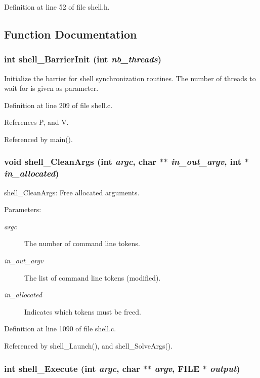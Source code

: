 Definition at line 52 of file shell.h.

\subsection{Function Documentation}
\subsubsection{\setlength{\rightskip}{0pt plus 5cm}int shell\_\-Barrier\-Init (int {\em nb\_\-threads})}\label{shell_8h_a10}


Initialize the barrier for shell synchronization routines. The number of threads to wait for is given as parameter. 

Definition at line 209 of file shell.c.

References P, and V.

Referenced by main().
\subsubsection{\setlength{\rightskip}{0pt plus 5cm}void shell\_\-Clean\-Args (int {\em argc}, char $\ast$$\ast$ {\em in\_\-out\_\-argv}, int $\ast$ {\em in\_\-allocated})}\label{shell_8h_a12}


shell\_\-Clean\-Args: Free allocated arguments.

\begin{Desc}
\item[Parameters:]
\begin{description}
\item[{\em argc}]The number of command line tokens. \item[{\em in\_\-out\_\-argv}]The list of command line tokens (modified). \item[{\em in\_\-allocated}]Indicates which tokens must be freed. \end{description}
\end{Desc}


Definition at line 1090 of file shell.c.

Referenced by shell\_\-Launch(), and shell\_\-Solve\-Args().
\subsubsection{\setlength{\rightskip}{0pt plus 5cm}int shell\_\-Execute (int {\em argc}, char $\ast$$\ast$ {\em argv}, FILE $\ast$ {\em output})}\label{shell_8h_a14}


